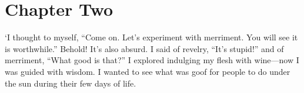 \chapter*{Chapter Two}

`I thought to myself, 
``Come on. Let's experiment with merriment. You will see it is worthwhile.''
Behold! It's also absurd. 
I said of revelry, ``It's stupid!'' 
and of merriment, ``What good is that?'' 
I explored indulging my flesh with wine---now I was guided with wisdom. 
I wanted to see what was goof for people to do under the sun 
during their few days of life.